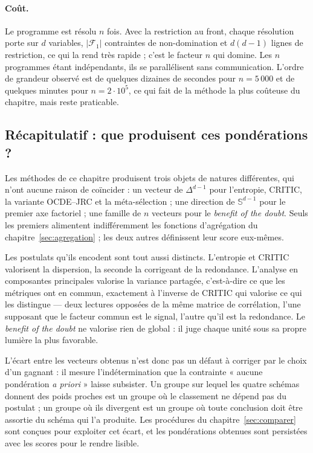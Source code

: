 \documentclass[11pt,a4paper]{article}
\theoremstyle{definition}
\theoremstyle{remark}
\newcommand{\Sphere}{\mathbb{S}}
\newcommand{\abs}[1]{\left\lvert #1 \right\rvert}
\newcommand{\simplex}{\Delta^{d-1}}
\begin{document}
\paragraph{Coût.} Le programme est résolu $n$ fois. Avec la restriction au front, chaque
résolution porte sur $d$ variables, $\abs{\mathcal{F}_1}$ contraintes de non-domination et
$d(d-1)$ lignes de restriction, ce qui la rend très rapide ; c'est le facteur $n$ qui
domine. Les $n$ programmes étant indépendants, ils se parallélisent sans communication.
L'ordre de grandeur observé est de quelques dizaines de secondes pour $n = 5\,000$ et de
quelques minutes pour $n = 2 \cdot 10^5$, ce qui fait de la méthode la plus coûteuse du
chapitre, mais reste praticable.

\bigskip

\subsection{Récapitulatif : que produisent ces pondérations ?}
\label{sec:poids-recap}

\medskip

Les méthodes de ce chapitre produisent trois objets de natures différentes, qui n'ont
aucune raison de coïncider : un vecteur de $\simplex$ pour l'entropie, CRITIC, la variante
OCDE--JRC et la méta-sélection ; une direction de $\Sphere^{d-1}$ pour le premier axe
factoriel ; une famille de $n$ vecteurs pour le \emph{benefit of the doubt}. Seuls les
premiers alimentent indifféremment les fonctions d'agrégation du
chapitre~\ref{sec:agregation} ; les deux autres définissent leur score eux-mêmes.

\bigskip

Les postulats qu'ils encodent sont tout aussi distincts. L'entropie et CRITIC valorisent
la dispersion, la seconde la corrigeant de la redondance. L'analyse en composantes
principales valorise la variance partagée, c'est-à-dire ce que les métriques ont en
commun, exactement à l'inverse de CRITIC qui valorise ce qui les distingue --- deux
lectures opposées de la même matrice de corrélation, l'une supposant que le facteur commun
est le signal, l'autre qu'il est la redondance. Le \emph{benefit of the doubt} ne valorise
rien de global : il juge chaque unité sous sa propre lumière la plus favorable.

\bigskip

L'écart entre les vecteurs obtenus n'est donc pas un défaut à corriger par le choix d'un
gagnant : il mesure l'indétermination que la contrainte « aucune pondération \emph{a
priori} » laisse subsister. Un groupe sur lequel les quatre schémas donnent des poids
proches est un groupe où le classement ne dépend pas du postulat ; un groupe où ils
divergent est un groupe où toute conclusion doit être assortie du schéma qui l'a produite.
Les procédures du chapitre~\ref{sec:comparer} sont conçues pour exploiter cet écart, et
les pondérations obtenues sont persistées avec les scores pour le rendre lisible.
\end{document}
